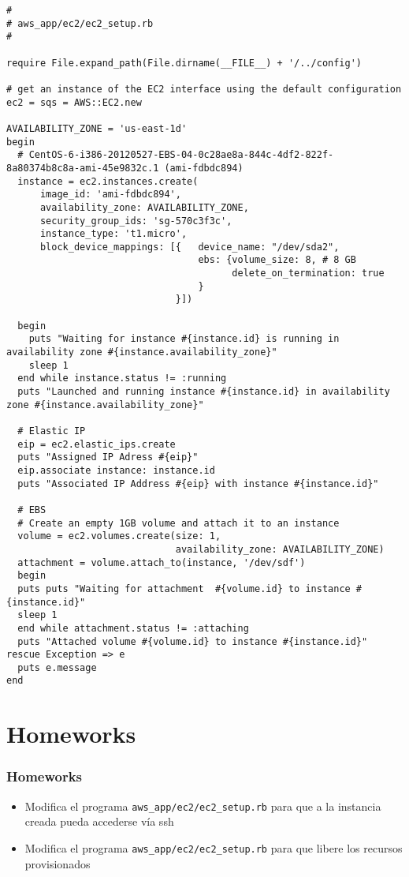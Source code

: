 \documentclass{beamer}
\begin{document}
\begin{frame}
\lstset{language=Ruby, style=eclipse}
\begin{lstlisting}
#
# aws_app/ec2/ec2_setup.rb
#

require File.expand_path(File.dirname(__FILE__) + '/../config')

# get an instance of the EC2 interface using the default configuration
ec2 = sqs = AWS::EC2.new

AVAILABILITY_ZONE = 'us-east-1d'
begin
  # CentOS-6-i386-20120527-EBS-04-0c28ae8a-844c-4df2-822f-8a80374b8c8a-ami-45e9832c.1 (ami-fdbdc894)
  instance = ec2.instances.create(
      image_id: 'ami-fdbdc894',
      availability_zone: AVAILABILITY_ZONE,
      security_group_ids: 'sg-570c3f3c',
      instance_type: 't1.micro',
      block_device_mappings: [{   device_name: "/dev/sda2",
                                  ebs: {volume_size: 8, # 8 GB
                                        delete_on_termination: true
                                  }
                              }])

  begin
    puts "Waiting for instance #{instance.id} is running in availability zone #{instance.availability_zone}"
    sleep 1
  end while instance.status != :running
  puts "Launched and running instance #{instance.id} in availability zone #{instance.availability_zone}"

  # Elastic IP
  eip = ec2.elastic_ips.create
  puts "Assigned IP Adress #{eip}"
  eip.associate instance: instance.id
  puts "Associated IP Address #{eip} with instance #{instance.id}"

  # EBS
  # Create an empty 1GB volume and attach it to an instance
  volume = ec2.volumes.create(size: 1,
                              availability_zone: AVAILABILITY_ZONE)
  attachment = volume.attach_to(instance, '/dev/sdf')
  begin
  puts puts "Waiting for attachment  #{volume.id} to instance #{instance.id}"
  sleep 1
  end while attachment.status != :attaching
  puts "Attached volume #{volume.id} to instance #{instance.id}"
rescue Exception => e
  puts e.message
end
\end{lstlisting}

\end{frame}
\section{Homeworks}
\begin{frame}[fragile]
\frametitle{Homeworks}
\begin{itemize}
\item Modifica el programa \texttt{aws\_app/ec2/ec2\_setup.rb} para que a la instancia creada pueda accederse vía ssh
\item Modifica el programa \texttt{aws\_app/ec2/ec2\_setup.rb} para que libere los recursos provisionados
\end{itemize}

\end{frame}
\end{document}

